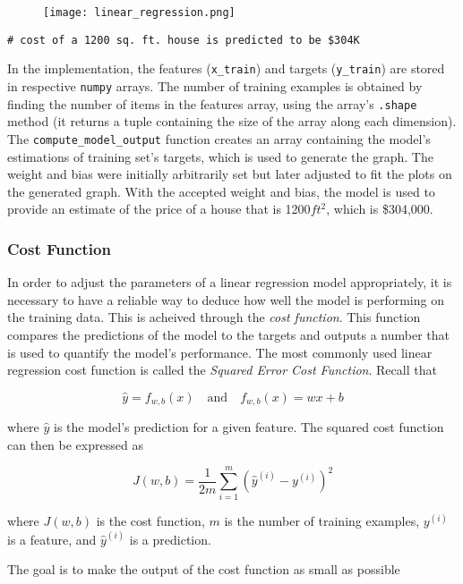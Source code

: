 \documentclass{article}
\begin{document}
\begin{figure}
\centering
\texttt{[image: linear\_regression.png]}
\end{figure}

\begin{lstlisting}[caption={Code Output}]
# cost of a 1200 sq. ft. house is predicted to be $304K
\end{lstlisting}

\noindent In the implementation, the features (\texttt{x\_train}) and targets (\texttt{y\_train}) are stored in respective \texttt{numpy} arrays. The number of training examples is obtained by finding the number of items in the features array, using the array's \texttt{.shape} method (it returns a tuple containing the size of the array along each dimension). The \texttt{compute\_model\_output} function creates an array containing the model's estimations of training set's targets, which is used to generate the graph. The weight and bias were initially arbitrarily set but later adjusted to fit the plots on the generated graph. With the accepted weight and bias, the model is used to provide an estimate of the price of a house that is 1200$ft^2$, which is \$304,000.

\subsubsection{Cost Function}
In order to adjust the parameters of a linear regression model appropriately, it is necessary to have a reliable way to deduce how well the model is performing on the training data. This is acheived through the \textit{cost function}. This function compares the predictions of the model to the targets and outputs a number that is used to quantify the model's performance. The most commonly used linear regression cost function is called the \textit{Squared Error Cost Function}. Recall that

\[
\hat{y} =  f_{w, b}(x) \quad \textrm{and} \quad f_{w, b}(x) = wx + b
\]

\noindent where $\hat{y}$ is the model's prediction for a given feature. The squared cost function can then be expressed as

\[ J(w, b) = \frac{1}{2m}\sum^{m}_{i = 1}{ ({ \hat{y}^{(i)} - y^{(i)} })^2 }\]

\noindent where $J(w, b)$ is the cost function, $m$ is the number of training examples, $y^{(i)}$ is a feature, and $\hat{y}^{(i)}$ is a prediction.

\noindent The goal is to make the output of the cost function as small as possible
\end{document}
